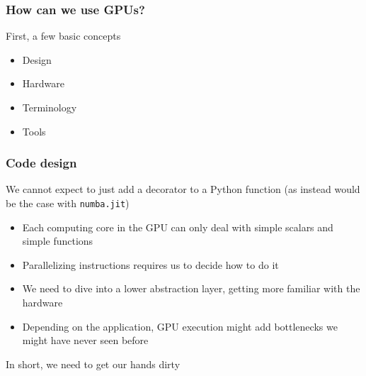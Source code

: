 \documentclass[10pt, aspectratio=1610]{beamer}
\begin{document}
\begin{frame}
  \frametitle{How can we use GPUs?}

  First, a few basic concepts

  \begin{itemize}
    \item Design
    \item Hardware
    \item Terminology
    \item Tools
  \end{itemize}

\end{frame}

\begin{frame}
  \frametitle{Code design}

  We cannot expect to just add a decorator to a Python function (as instead would be the case with \texttt{numba.jit})

  \begin{itemize}
    \item Each computing core in the GPU can only deal with simple scalars and simple functions
    \item Parallelizing instructions requires us to decide how to do it
    \item We need to dive into a lower abstraction layer, getting more familiar with the hardware
    \item Depending on the application, GPU execution might add bottlenecks we might have never seen before
  \end{itemize}

  In short, we need to get our hands dirty

\end{frame}
\end{document}
